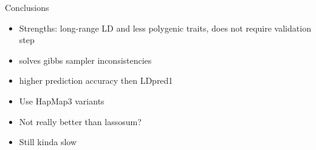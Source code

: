 \documentclass{beamer}
\begin{document}
     \begin{frame}{Conclusions}
        \begin{itemize}
            \item Strengths: long-range LD and less polygenic traits, does not require validation step
            \item solves gibbs sampler inconsistencies
            \item higher prediction accuracy then LDpred1
            \item Use HapMap3 variants
           \newline
           \newline
            \item Not really better than lassosum?
            \item Still kinda slow
        \end{itemize}
       \end{frame}
    
    
    
    
  
    



\end{document}
